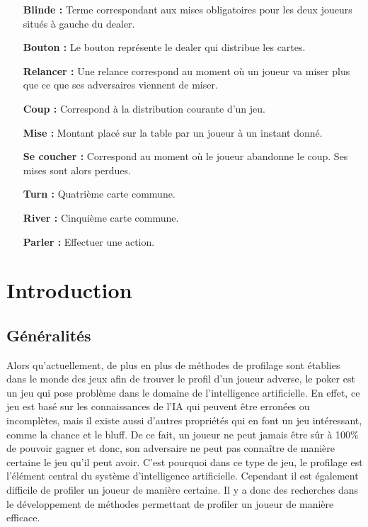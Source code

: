 \documentclass{report}
\begin{document}
\begin{itemize}
		\item[\textbf{Blinde : }]Terme correspondant aux mises obligatoires pour les deux joueurs situés à gauche du dealer.\medskip
		
		\item[\textbf{Bouton : }]Le bouton représente le dealer qui distribue les cartes.\medskip
		
		\item[\textbf{Relancer : }]Une relance correspond au moment où un joueur va miser plus que ce que ses adversaires viennent de miser.\medskip
		
		\item[\textbf{Coup : }]Correspond à la distribution courante d'un jeu.\medskip
		
		\item[\textbf{Mise : }]Montant placé sur la table par un joueur à un instant donné.\medskip
		
		\item[\textbf{Se coucher : }]Correspond au moment où le joueur abandonne le coup. Ses mises sont alors perdues.\medskip
		
		\item[\textbf{Turn : }]Quatrième carte commune.\medskip
		
		\item[\textbf{River : }]Cinquième carte commune.\medskip
		
		\item[\textbf{Parler :}]Effectuer une action.\medskip
		
\end{itemize}



\chapter{Introduction}

\section{Généralités}
\hspace{0.5cm}Alors qu'actuellement, de plus en plus de méthodes de profilage sont établies dans le monde des jeux afin de trouver le profil d'un joueur adverse, le poker est un jeu qui pose problème dans le domaine de l'intelligence artificielle. En effet, ce jeu est basé sur les connaissances de l'IA qui peuvent être erronées ou incomplètes, mais il existe aussi d'autres propriétés qui en font un jeu intéressant, comme la chance et le bluff. De ce fait, un joueur ne peut jamais être sûr à 100\% de pouvoir gagner et donc, son adversaire ne peut pas connaître de manière certaine le jeu qu'il peut avoir. C'est pourquoi dans ce type de jeu, le profilage est l'élément central du système d'intelligence artificielle. Cependant il est également difficile de profiler un joueur de manière certaine. Il y a donc des recherches dans le développement de méthodes permettant de profiler un joueur de manière efficace.\par
\end{document}
